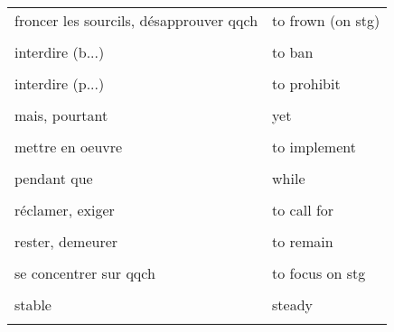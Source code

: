 \documentclass[
  10pt,
]{article}
\begin{document}
\begin{longtable}{ll}
froncer les sourcils, désapprouver qqch & to frown (on stg)\\

\cellcolor{gray!6}{grandir} & \cellcolor{gray!6}{to grow up}\\

interdire (b...) & to ban\\

\cellcolor{gray!6}{interdire (f...)} & \cellcolor{gray!6}{to forbid}\\

interdire (p...) & to prohibit\\

\cellcolor{gray!6}{le siège d'une entreprise} & \cellcolor{gray!6}{the headquarters}\\

mais, pourtant & yet\\

\cellcolor{gray!6}{même si (concession)} & \cellcolor{gray!6}{even though}\\

mettre en oeuvre & to implement\\

\cellcolor{gray!6}{obligatoire} & \cellcolor{gray!6}{compulsory}\\

pendant que & while\\

\cellcolor{gray!6}{pouvoir s'acheter qqch} & \cellcolor{gray!6}{to afford something}\\

réclamer, exiger & to call for\\

\cellcolor{gray!6}{rendre un hommage} & \cellcolor{gray!6}{to pay a tribute}\\

rester, demeurer & to remain\\

\cellcolor{gray!6}{s'avérer} & \cellcolor{gray!6}{to turn out}\\

se concentrer sur qqch & to focus on stg\\

\cellcolor{gray!6}{s'empresser de} & \cellcolor{gray!6}{to rush to do stg}\\

stable & steady\\

\cellcolor{gray!6}{une politique, une mesure} & \cellcolor{gray!6}{a policy}\\


\end{longtable}
\end{document}
